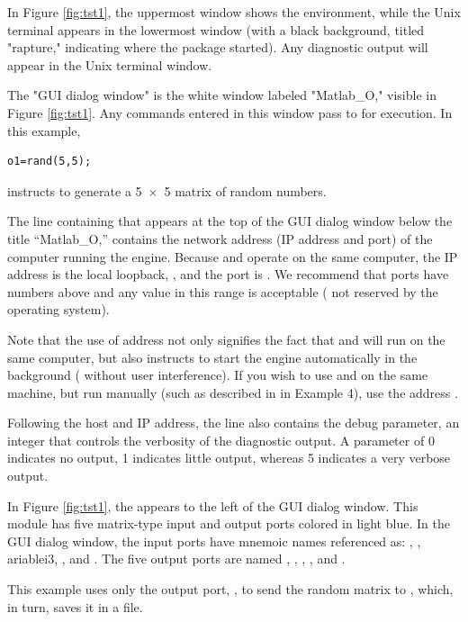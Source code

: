 In Figure \ref{fig:tst1}, the uppermost window shows the \sr{} environment,
while the Unix terminal appears in the lowermost window (with a black
background, titled "rapture," indicating where the package started).  Any
diagnostic output will appear in the Unix terminal window.

The "GUI dialog window" is the white window labeled "Matlab\_O," visible in
Figure \ref{fig:tst1}. Any commands entered in this window pass to \m{} for
execution. In this example,
%
\begin{verbatim}
o1=rand(5,5);
\end{verbatim}
%
instructs \m{} to generate a 5~$\times$~5 matrix of random numbers.

The line containing  that appears at the top of the
\mlm{} GUI dialog window below the title ``Matlab\_O,'' contains the
network address (IP address and port) of the computer running the \m{}
engine.  Because \m{} and \sr{} operate on the same computer, the IP
address is the local loopback, , and the port is
. We recommend that ports have numbers above  and any
value in this range is acceptable (\ie{} not reserved by the operating
system).

Note that the use of address  not only signifies the fact
that \sr{} and \m{} will run on the same computer, but also instructs
\mlm{} to start the \m engine automatically in the background (\ie{}
without user interference).  If you wish to use \sr and \m{} on the same
machine, but run \m{} manually (such as described in in Example 4), use the
address .

Following the host and IP address, the  line also
contains the debug  parameter, an integer that controls the
verbosity of the diagnostic output.  A  parameter of 0
indicates no output, 1 indicates little output, whereas 5 indicates a very
verbose output.

In Figure \ref{fig:tst1}, the \mlm{} appears to the left of the GUI dialog
window.  This module has five matrix-type input and output ports colored in
light blue.  In the \mlm{} GUI dialog window, the input ports have mnemoic
names referenced as: , , ariable{i3},
, and .  The five output ports are named
, , , , and
.

This example uses only the output port, , to send the
random matrix to \sr{}, which, in turn, saves it in a file.

